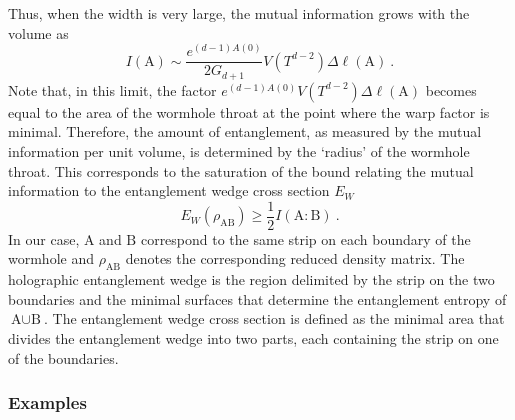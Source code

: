 Thus, when the width is very large, the mutual information grows with the volume as
\begin{equation}\label{eq:mutualinfolarge}
	I(\text{A})\sim \frac{e^{(d-1)A(0)}}{2G_{d+1}}V(T^{d-2})\Delta \ell(\text{A})\ .
\end{equation}
Note that, in this limit, the factor $e^{(d-1)A(0)}V(T^{d-2})\Delta \ell(\text{A})$ becomes equal to the area of the wormhole throat at the point where the warp factor is minimal. Therefore, the amount of entanglement, as measured by the mutual information per unit volume, is determined by the `radius' of the wormhole throat. This corresponds to the saturation of the bound relating the mutual information to the entanglement wedge cross section $E_W$ \cite{Freedman:2016zud,Takayanagi:2017knl}
\begin{equation}
	E_{W}(\rho_{\text{AB}}) \geq \frac{1}{2}I(\text{A}:\text{B})\ .
\end{equation}
In our case, $\text{A}$ and $\text{B}$ correspond to the same strip on each boundary of the wormhole and $\rho_{\text{AB}}$ denotes the corresponding reduced density matrix. The holographic entanglement wedge \cite{Czech:2012bh,Wall:2012uf,Headrick:2014cta} is the region delimited by the strip on the two boundaries and the minimal surfaces that determine the entanglement entropy of $\text{A}\cup\text{B}$. The entanglement wedge cross section is defined as the minimal area that divides the entanglement wedge into two parts, each containing the strip on one of the boundaries.

\subsubsection{Examples}

